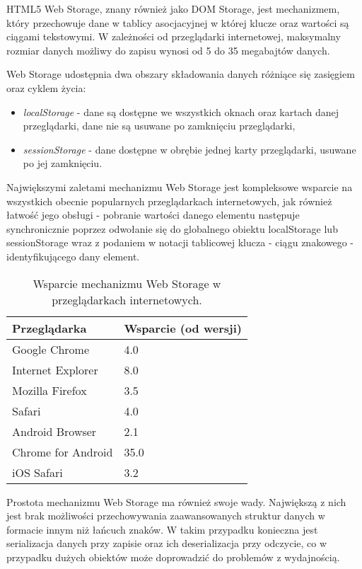 HTML5 Web Storage\cite{webStorage}, znany również jako DOM Storage, jest mechanizmem, który przechowuje dane w tablicy asocjacyjnej w której klucze oraz wartości są ciągami tekstowymi. W zależności od przeglądarki internetowej, maksymalny rozmiar danych możliwy do zapisu wynosi od 5 do 35 megabajtów danych.

Web Storage udostępnia dwa obszary składowania danych różniące się zasięgiem oraz cyklem życia:

\begin{itemize}
\item \emph{localStorage} - dane są dostępne we wszystkich oknach oraz kartach danej przeglądarki, dane nie są usuwane po zamknięciu przeglądarki,
\item \emph{sessionStorage} - dane dostępne w obrębie jednej karty przeglądarki, usuwane po jej zamknięciu.
\end{itemize}

Największymi zaletami mechanizmu Web Storage jest kompleksowe wsparcie na wszystkich obecnie popularnych przeglądarkach internetowych, jak również łatwość jego obsługi - pobranie wartości danego elementu następuje synchronicznie poprzez odwołanie się do globalnego obiektu localStorage lub sessionStorage wraz z podaniem w notacji tablicowej klucza - ciągu znakowego - identyfikującego dany element.

\begin{table}[h]
\centering
    \begin{tabular}{ | p{8cm} | p{6cm} | }
    \hline
    \textbf{Przeglądarka} & \textbf{Wsparcie (od wersji)} \\ \hline
	Google Chrome & 4.0
	\\ \hline
	Internet Explorer & 8.0
	\\ \hline
	Mozilla Firefox & 3.5
	\\ \hline
	Safari & 4.0
	\\ \hline
	Android Browser & 2.1
	\\ \hline
	Chrome for Android & 35.0
	\\ \hline
	iOS Safari & 3.2
	\\ \hline
    \end{tabular}
	\caption{Wsparcie mechanizmu Web Storage w przeglądarkach internetowych.}
\end{table}

Prostota mechanizmu Web Storage ma również swoje wady. Największą z nich jest brak możliwości przechowywania zaawansowanych struktur danych w formacie innym niż łańcuch znaków. W takim przypadku konieczna jest serializacja danych przy zapisie oraz ich deserializacja przy odczycie, co w przypadku dużych obiektów może doprowadzić do problemów z wydajnością.

